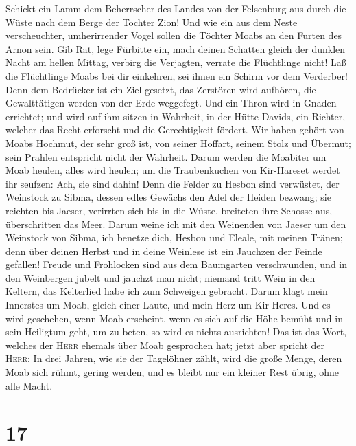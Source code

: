  Schickt ein Lamm dem Beherrscher des Landes von der
Felsenburg aus durch die Wüste nach dem Berge der Tochter Zion!
 Und wie ein aus dem Neste verscheuchter, umherirrender
Vogel sollen die Töchter Moabs an den Furten des Arnon sein.
 Gib Rat, lege Fürbitte ein, mach deinen Schatten gleich
der dunklen Nacht am hellen Mittag, verbirg die Verjagten, verrate die
Flüchtlinge nicht!  Laß die Flüchtlinge Moabs bei dir
einkehren, sei ihnen ein Schirm vor dem Verderber! Denn dem Bedrücker
ist ein Ziel gesetzt, das Zerstören wird aufhören, die Gewalttätigen
werden von der Erde weggefegt.  Und ein Thron wird in
Gnaden errichtet; und wird auf ihm sitzen in Wahrheit, in der Hütte
Davids, ein Richter, welcher das Recht erforscht und die Gerechtigkeit
fördert.  Wir haben gehört von Moabs Hochmut, der sehr
groß ist, von seiner Hoffart, seinem Stolz und Übermut; sein Prahlen
entspricht nicht der Wahrheit.  Darum werden die Moabiter
um Moab heulen, alles wird heulen; um die Traubenkuchen von Kir-Hareset
werdet ihr seufzen: Ach, sie sind dahin!  Denn die Felder
zu Hesbon sind verwüstet, der Weinstock zu Sibma, dessen edles Gewächs
den Adel der Heiden bezwang; sie reichten bis Jaeser, verirrten sich bis
in die Wüste, breiteten ihre Schosse aus, überschritten das Meer.
 Darum weine ich mit den Weinenden von Jaeser um den
Weinstock von Sibma, ich benetze dich, Hesbon und Eleale, mit meinen
Tränen; denn über deinen Herbst und in deine Weinlese ist ein Jauchzen
der Feinde gefallen!  Freude und Frohlocken sind aus dem
Baumgarten verschwunden, und in den Weinbergen jubelt und jauchzt man
nicht; niemand tritt Wein in den Keltern, das Kelterlied habe ich zum
Schweigen gebracht.  Darum klagt mein Innerstes um Moab,
gleich einer Laute, und mein Herz um Kir-Heres.  Und es
wird geschehen, wenn Moab erscheint, wenn es sich auf die Höhe bemüht
und in sein Heiligtum geht, um zu beten, so wird es nichts ausrichten!
 Das ist das Wort, welches der \textsc{Herr} ehemals über
Moab gesprochen hat;  jetzt aber spricht der
\textsc{Herr}: In drei Jahren, wie sie der Tagelöhner zählt, wird die
große Menge, deren Moab sich rühmt, gering werden, und es bleibt nur ein
kleiner Rest übrig, ohne alle Macht.

\hypertarget{section-16}{%
\section{17}\label{section-16}}

